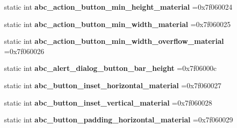 \begin{DoxyCompactItemize}
\item 
\mbox{\label{classandroid_1_1support_1_1graphics_1_1drawable_1_1R_1_1dimen_ad494ee8b6289b7a2a350742fa328ec3f}} 
static int {\bfseries abc\+\_\+action\+\_\+button\+\_\+min\+\_\+height\+\_\+material} =0x7f060024
\item 
\mbox{\label{classandroid_1_1support_1_1graphics_1_1drawable_1_1R_1_1dimen_a40ca9bbd0fac1c6b25499c9c4143f5f4}} 
static int {\bfseries abc\+\_\+action\+\_\+button\+\_\+min\+\_\+width\+\_\+material} =0x7f060025
\item 
\mbox{\label{classandroid_1_1support_1_1graphics_1_1drawable_1_1R_1_1dimen_a93717ab7097cd47d03c8049847db2039}} 
static int {\bfseries abc\+\_\+action\+\_\+button\+\_\+min\+\_\+width\+\_\+overflow\+\_\+material} =0x7f060026
\item 
\mbox{\label{classandroid_1_1support_1_1graphics_1_1drawable_1_1R_1_1dimen_acc35a6a5caad0de3ed5c0c578bfe3ff2}} 
static int {\bfseries abc\+\_\+alert\+\_\+dialog\+\_\+button\+\_\+bar\+\_\+height} =0x7f06000c
\item 
\mbox{\label{classandroid_1_1support_1_1graphics_1_1drawable_1_1R_1_1dimen_ae68776123b1cd6c595f74853abf1ddd1}} 
static int {\bfseries abc\+\_\+button\+\_\+inset\+\_\+horizontal\+\_\+material} =0x7f060027
\item 
\mbox{\label{classandroid_1_1support_1_1graphics_1_1drawable_1_1R_1_1dimen_a2bf08fb71f76e879513754cf54ac7bca}} 
static int {\bfseries abc\+\_\+button\+\_\+inset\+\_\+vertical\+\_\+material} =0x7f060028
\item 
\mbox{\label{classandroid_1_1support_1_1graphics_1_1drawable_1_1R_1_1dimen_a7c5f63ba20fcb722860777b9967a75ef}} 
static int {\bfseries abc\+\_\+button\+\_\+padding\+\_\+horizontal\+\_\+material} =0x7f060029
\item 

\end{DoxyCompactItemize}
